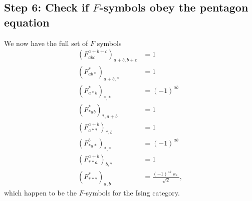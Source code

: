 \subsection*{Step 6: Check if $F$-symbols obey the pentagon equation} 
We now have the full set of $F$ symbols
	\begin{align*}
		\left(F_{abc}^{a+b+c}\right)_{a+b,b+c}&=1\\
		\left(F_{ab*}^*\right)_{a+b,*}&=1\\
		\left(F_{a*b}^*\right)_{*,*}&=(-1)^{ab}\\
		\left(F_{*ab}^*\right)_{*,a+b}&=1\\
		\left(F_{a**}^{a+b}\right)_{*,b}&=1\\
		\left(F_{*a*}^b\right)_{*,*}&=(-1)^{ab}\\
		\left(F_{**a}^{a+b}\right)_{b,*}&=1\\
		\left(F_{***}^*\right)_{a,b}&=\frac{(-1)^{ab}\varkappa_*}{\sqrt{2}},
	\end{align*}
which happen to be the $F$-symbols for the Ising category. 